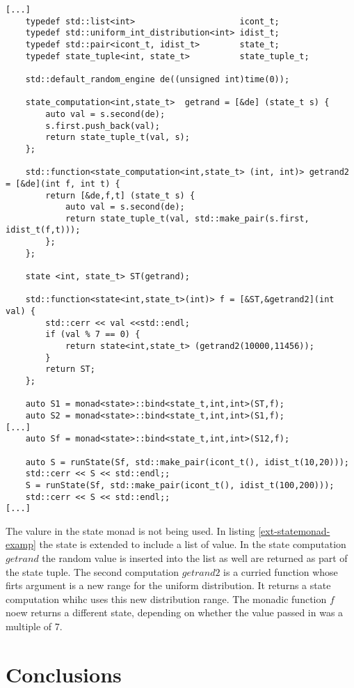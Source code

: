 \documentclass[12pt,fleqn]{article}
\begin{document}
\begin{lstlisting}[caption=extended state monad example, label=ext-statemonad-examp]
[...]
	typedef std::list<int>                     icont_t;
	typedef std::uniform_int_distribution<int> idist_t;
	typedef std::pair<icont_t, idist_t>        state_t;
	typedef state_tuple<int, state_t>          state_tuple_t;

	std::default_random_engine de((unsigned int)time(0));

	state_computation<int,state_t>  getrand = [&de] (state_t s) {
		auto val = s.second(de);
		s.first.push_back(val);
		return state_tuple_t(val, s);
 	}; 
	
	std::function<state_computation<int,state_t> (int, int)> getrand2 = [&de](int f, int t) {
		return [&de,f,t] (state_t s) {
			auto val = s.second(de);
			return state_tuple_t(val, std::make_pair(s.first, idist_t(f,t)));
		}; 
	};

	state <int, state_t> ST(getrand);

	std::function<state<int,state_t>(int)> f = [&ST,&getrand2](int val) {
		std::cerr << val <<std::endl; 
		if (val % 7 == 0) {
			return state<int,state_t> (getrand2(10000,11456));
		}
		return ST;
	};

	auto S1 = monad<state>::bind<state_t,int,int>(ST,f);
	auto S2 = monad<state>::bind<state_t,int,int>(S1,f);
[...]
	auto Sf = monad<state>::bind<state_t,int,int>(S12,f);

	auto S = runState(Sf, std::make_pair(icont_t(), idist_t(10,20)));
	std::cerr << S << std::endl;;
	S = runState(Sf, std::make_pair(icont_t(), idist_t(100,200)));
	std::cerr << S << std::endl;;
[...]
\end{lstlisting}

The valure in the state monad is not being used. 
In listing \ref{ext-statemonad-examp} the state is extended to include a list of value.
In the state computation $getrand$ the random value is inserted into the list as well are returned as part of the state tuple.
The second computation $getrand2$ is a curried function whose firts argument is a new range for the uniform distribution.
It returns a state computation whihc uses this new distribution range.
The monadic function $f$ noew returns a different state, depending on whether the value passed in was a multiple of 7.



\section*{Conclusions}
\end{document}
